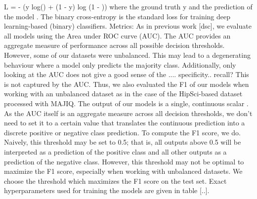 L = - (y log() + (1 - y) log (1 - ))
where the ground truth y  and the prediction of the model  \in [0, 1]. The binary cross-entropy is the standard loss for training deep learning-based (binary) classifiers.
Metrics:
As in previous work [dsc], we evaluate all models using the Area under ROC curve (AUC). The AUC provides an aggregate measure of performance across all possible decision thresholds.
However, some of our datasets were unbalanced. This may lead to a degenerating behaviour where a model only predicts the majority class. Additionally, only looking at the AUC does not give a good sense of the .... specificity.. recall?
This is not captured by the AUC.
Thus, we also evaluated the F1 of our models when working with an unbalanced dataset as in the case of the HipSci-based dataset processed with MAJIQ.
The output of our models is a single, continuous scalar  \in [0, 1]. As the AUC itself is an aggregate measure across all decision thresholds, we don't need to set it to a certain value that translates the continuous prediction into a discrete positive or negative class prediction. To compute the F1 score, we do. Naively, this threshold may be set to 0.5; that is, all outputs above 0.5 will be interpreted as a prediction of the positive class and all other outputs as a prediction of the negative class. However, this threshold may not be optimal to maximize the F1 score, especially when working with unbalanced datasets. We choose the threshold which maximizes the F1 score on the test set.
Exact hyperparameters used for training the models are given in table [..].
